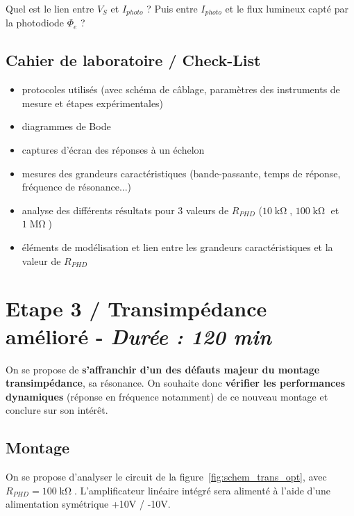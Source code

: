 \Quest Quel est le lien entre $V_S$ et $I_{photo}$ ? Puis entre $I_{photo}$ et le flux lumineux capté par la photodiode $\Phi_e$ ?


\subsection{Cahier de laboratoire / Check-List}

\begin{itemize}[label=$\square$]
	\item protocoles utilisés (avec schéma de câblage, paramètres des instruments de mesure et étapes expérimentales)
	\item diagrammes de Bode
	\item captures d'écran des réponses à un échelon
	\item mesures des grandeurs caractéristiques (bande-passante, temps de réponse, fréquence de résonance...)
	\item analyse des différents résultats pour 3 valeurs de $R_{PHD}$ ($10\operatorname{k\Omega}$, $100\operatorname{k\Omega}$ et $1\operatorname{M\Omega}$)
	\item éléments de modélisation et lien entre les grandeurs caractéristiques et la valeur de $R_{PHD}$
\end{itemize}



\clearpage
\section{Etape 3 / Transimpédance amélioré - \textit{Durée : 120 min}}

On se propose de \textbf{s'affranchir d'un des défauts majeur du montage transimpédance}, sa résonance. On souhaite donc \textbf{vérifier les performances dynamiques} (réponse en fréquence notamment) de ce nouveau montage et conclure sur son intérêt.


\subsection{Montage}

On se propose d'analyser le circuit de la figure~\ref{fig:schem_trans_opt}, avec $R_{PHD} = 100\operatorname{k\Omega}$. L'amplificateur linéaire intégré sera alimenté à l'aide d'une alimentation symétrique +10V / -10V.

